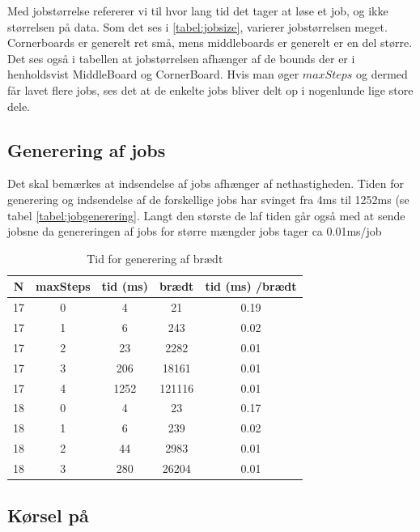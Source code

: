 Med jobstørrelse refererer vi til hvor lang tid det tager at løse et job, og
ikke størrelsen på data.  Som det ses i \ref{tabel:jobsize}, varierer
jobstørrelsen meget. Cornerboards er generelt ret små, mens middleboards er
generelt er en del større. Det ses også i tabellen at jobstørrelsen afhænger af
de bounds der er i henholdsvist MiddleBoard og CornerBoard. Hvis man øger
$maxSteps$ og dermed får lavet flere jobs, ses det at de enkelte jobs bliver
delt op i nogenlunde lige store dele.

\subsection{Generering af jobs}

Det skal bemærkes at indsendelse af jobs afhænger af nethastigheden. Tiden for
generering og indsendelse af de forskellige jobs har svinget fra 4ms til 1252ms
(se tabel \ref{tabel:jobgenerering}. Langt den største de laf tiden går også med
at sende jobsne da genereringen af jobs for større mængder jobs tager ca
0.01ms/job

\begin{table}
\begin{center}
\begin{tabular}{|c|c|c|c|c|}
\hline N & maxSteps & tid (ms) & brædt & tid (ms) /brædt \\
\hline 17 & 0 & 4 & 21 & 0.19 \\
\hline 17 & 1 & 6 & 243 & 0.02 \\
\hline 17 & 2 & 23 & 2282 & 0.01 \\
\hline 17 & 3 & 206 & 18161 & 0.01 \\
\hline 17 & 4 & 1252 & 121116 & 0.01 \\
\hline 18 & 0 & 4 & 23 & 0.17 \\
\hline 18 & 1 & 6 & 239 & 0.02 \\
\hline 18 & 2 & 44 & 2983 & 0.01 \\
\hline 18 & 3 & 280 & 26204 & 0.01 \\
\hline
\end{tabular}
\caption{Tid for generering af brædt}
\label{table:boardgenering}
\end{center}
\end{table}

\subsection{Kørsel på \mig}

